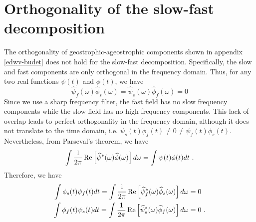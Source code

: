 \documentclass[../Rajarshi-thesis-draft.tex]{subfiles}
\begin{document}
\section{Orthogonality of the slow-fast decomposition}\label{edwv-sfdet}

The orthogonality of geostrophic-ageostrophic components shown in appendix \ref{edwv-budet} does not hold for the slow-fast decomposition. Specifically, the slow and fast components are only orthogonal in the frequency domain. Thus, for any two real functions $\psi(t)$ and $\phi(t)$, we have
\begin{equation}
    \label{edwv-sff}
    \hat{\psi}_f(\omega) \hat{\phi}_s(\omega) = \hat{\psi}_s(\omega) \hat{\phi}_f(\omega) = 0
\end{equation} 
Since we use  a sharp frequency filter, the fast field has no slow frequency components while the slow field has no high frequency components. This lack of overlap leads to perfect orthogonality in the frequency domain, although it does not translate to the time domain, i.e. $\psi_s(t)\phi_f(t)\neq 0 \neq \psi_f(t)\phi_s(t)$. Nevertheless, from Parseval's theorem, we have 
\begin{align}
 \begin{split}
 \int \frac{1}{2\pi} \operatorname{Re}\left[\widehat{\psi}^*(\omega) \widehat{\phi}(\omega) \right] d\omega = \int \psi(t)\phi(t) dt \ .
 \end{split}
\end{align}
Therefore, we have 
\begin{align}
 \label{edwv-sforth}
 \begin{split}
 \int \phi_s(t)\psi_f(t) dt= \int\frac{1}{2\pi} \operatorname{Re}\left[\widehat{\psi}_f^*(\omega) \widehat{\phi}_s(\omega) \right] d\omega &= 0 \\ 
 \int \phi_f(t)\psi_s(t) dt= \int\frac{1}{2\pi} \operatorname{Re}\left[\widehat{\psi}_s^*(\omega) \widehat{\phi}_f(\omega) \right] d\omega &= 0 \ .
 \end{split}
\end{align}
\end{document}
